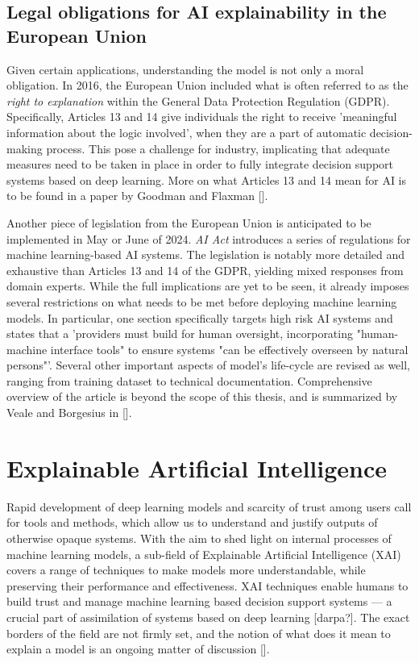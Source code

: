 \subsection*{Legal obligations for AI explainability in the European Union}

Given certain applications, understanding the model is not only a moral obligation. In 2016, the European Union included what is often referred to as the \emph{right to explanation} within the General Data Protection Regulation (GDPR). Specifically, Articles 13 and 14 give individuals the right to receive 'meaningful information about the logic involved', when they are a part of automatic decision-making process.  This pose a challenge for industry, implicating that adequate measures need to be taken in place in order to fully integrate decision support systems based on deep learning. More on what Articles 13 and 14 mean for AI is to be found in a paper by Goodman and Flaxman [].


Another piece of legislation from the European Union is anticipated to be implemented in May or June of 2024. \emph{AI Act} introduces a series of regulations for machine learning-based AI systems. The legislation is notably more detailed and exhaustive than Articles 13 and 14 of the GDPR, yielding mixed responses from domain experts. While the full implications are yet to be seen, it already imposes several restrictions on what needs to be met before deploying machine learning models. In particular, one section specifically targets high risk AI systems and states that a 'providers must build for human oversight, incorporating "human-machine interface tools" to ensure systems "can be effectively overseen by natural persons"'. Several other important aspects of model's life-cycle are revised as well, ranging from training dataset to technical documentation. Comprehensive overview of the article is beyond the scope of this thesis, and is summarized by Veale and Borgesius in [].


\section{Explainable Artificial Intelligence}

Rapid development of deep learning models and scarcity of trust among users call for tools and methods, which allow us to understand and justify outputs of otherwise opaque systems. With the aim to shed light on internal processes of machine learning models, a sub-field of Explainable Artificial Intelligence (XAI) covers a range of techniques to make models more understandable, while preserving their performance and effectiveness. XAI techniques enable humans to build trust and manage machine learning based decision support systems --- a crucial part of assimilation of systems based on deep learning [darpa?]. The exact borders of the field are not firmly set, and the notion of what does it mean to explain a model is an ongoing matter of discussion [].

